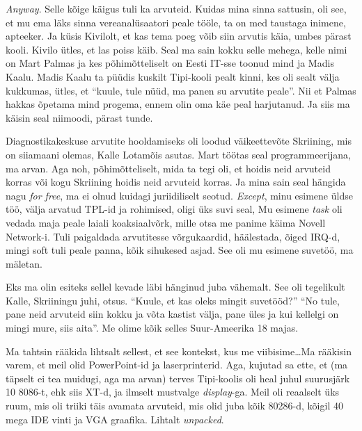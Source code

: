 \emph{Anyway}. Selle kõige käigus tuli ka arvuteid. Kuidas mina sinna 
sattusin, oli see, et mu ema läks sinna vereanalüsaatori peale tööle, ta on med 
taustaga inimene, apteeker. Ja küsis Kivilolt, et kas tema poeg võib siin 
arvutis käia, umbes pärast kooli. Kivilo ütles, et las poiss käib. Seal ma sain 
kokku selle mehega, kelle nimi on Mart Palmas ja kes 
põhimõtteliselt on Eesti IT-sse toonud  mind ja Madis Kaalu. Madis Kaalu ta püüdis kuskilt Tipi-kooli pealt kinni, kes oli sealt 
välja kukkumas, ütles, et \enquote{kuule, tule nüüd, ma panen su arvutite 
peale}. Nii et Palmas hakkas õpetama mind  progema, ennem olin oma käe 
peal harjutanud. Ja siis ma käisin seal niimoodi, pärast tunde. 


Diagnostikakeskuse arvutite hooldamiseks oli loodud väikeettevõte 
Skriining, mis on siiamaani olemas, Kalle 
Lotamõis asutas. Mart töötas seal programmeerijana, 
ma arvan. Aga noh, põhimõtteliselt, mida ta tegi oli, et hoidis neid arvuteid 
korras või kogu Skriining hoidis neid arvuteid korras. Ja mina sain seal 
hängida nagu \emph{for free}, ma ei olnud kuidagi juriidiliselt seotud. 
\emph{Except}, minu esimene üldse töö, välja arvatud TPL-id ja rohimised, oligi üks suvi seal, Mu esimene 
\emph{task} oli vedada maja peale laiali koaksiaalvõrk, mille otsa me panime käima 
Novell Network-i. Tuli paigaldada  arvutitesse võrgukaardid, häälestada, 
õiged IRQ-d, mingi soft tuli peale panna, kõik sihukesed asjad. See oli mu 
esimene suvetöö, ma mäletan.


Eks ma olin esiteks sellel kevade läbi hänginud juba vähemalt. See oli 
tegelikult Kalle, Skriiningu juhi, otsus. 
\enquote{Kuule, et kas oleks mingit suvetööd?} \enquote{No tule, pane neid 
arvuteid siin kokku ja võta kastist välja, pane üles ja kui kellelgi on 
mingi mure, siis aita}. Me olime kõik selles Suur-Ameerika 18 majas. 

Ma tahtsin rääkida lihtsalt sellest, et see kontekst, kus me viibisime\ldots Ma 
rääkisin varem, et meil olid PowerPoint-id ja  laserprinterid. Aga, kujutad sa 
ette, et (ma täpselt ei tea muidugi, aga ma arvan) terves Tipi-koolis oli heal 
juhul suurusjärk 10 8086-t, ehk siis XT-d, ja ilmselt mustvalge 
\emph{display}-ga. Meil oli reaalselt üks ruum, mis oli triiki täis 
avamata arvuteid, mis olid juba kõik 80286-d, kõigil 40 mega IDE vinti ja VGA 
graafika. Lihtalt \emph{unpacked}. 

